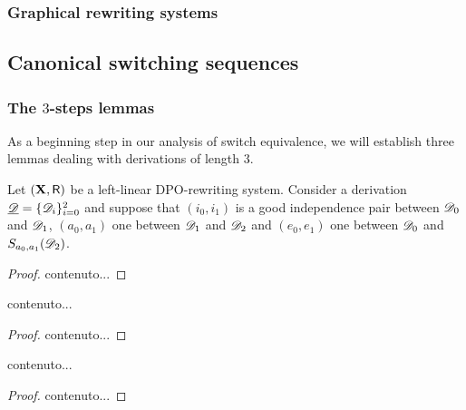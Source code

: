 \subsubsection{Graphical rewriting systems}\label{subsubsec:graphical}


\subsection{Canonical switching sequences}

\subsubsection{The $3$-steps lemmas} 

As a beginning step in our analysis of switch equivalence, we will establish three lemmas  dealing with derivations of length $3$. 


\begin{lemma}\label{lem:primo}
Let $(\textbf {\textup{X}},\mathsf{R})$ be a left-linear DPO-rewriting system. Consider a derivation $\underline{\mathscr{D}}=\{\mathscr{D}_i\}_{i=0}^2$ and suppose that $(i_0,i_1)$ is a good independence pair between $\mathscr{D}_0$ and $\mathscr{D}_1$, $(a_0,a_1)$ one between $\mathscr{D}_1$ and $\mathscr{D}_2$ and $(e_0, e_1)$ one between $\mathscr{D}_0$ and $S_{a_0,a_1}(\mathscr{D}_2)$.
\end{lemma}
\begin{proof}
	contenuto...
\end{proof}


\begin{lemma}\label{lem:secondo}
	contenuto...
\end{lemma}
\begin{proof}
	contenuto...
\end{proof}



\begin{lemma}\label{lem:terzo}
	contenuto...
\end{lemma}
\begin{proof}
	contenuto...
\end{proof}


